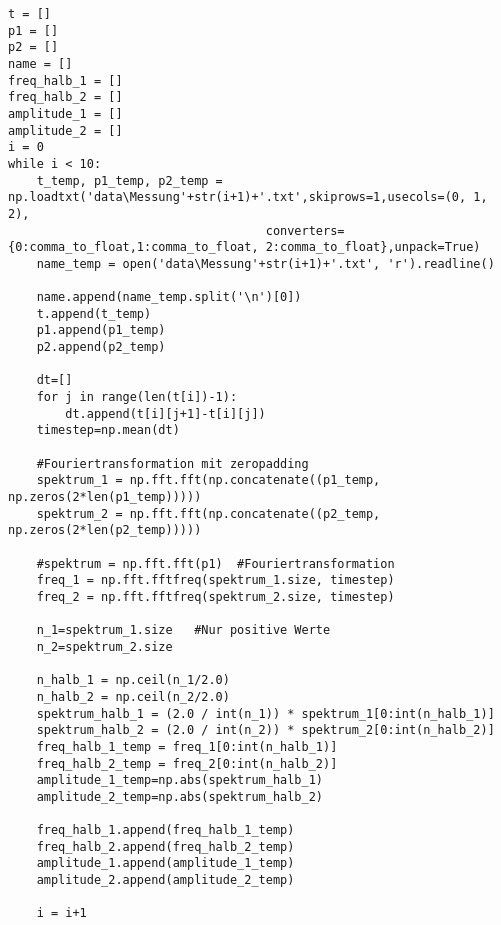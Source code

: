 \documentclass[a4paper,10pt]{article}
\begin{document}
\begin{lstlisting}
t = []
p1 = []
p2 = []
name = []
freq_halb_1 = []
freq_halb_2 = []
amplitude_1 = []
amplitude_2 = []
i = 0
while i < 10:
    t_temp, p1_temp, p2_temp = np.loadtxt('data\Messung'+str(i+1)+'.txt',skiprows=1,usecols=(0, 1, 2),
                                    converters={0:comma_to_float,1:comma_to_float, 2:comma_to_float},unpack=True)
    name_temp = open('data\Messung'+str(i+1)+'.txt', 'r').readline()
    
    name.append(name_temp.split('\n')[0])
    t.append(t_temp)
    p1.append(p1_temp)
    p2.append(p2_temp)
    
    dt=[]
    for j in range(len(t[i])-1): 
        dt.append(t[i][j+1]-t[i][j])
    timestep=np.mean(dt)
    
    #Fouriertransformation mit zeropadding
    spektrum_1 = np.fft.fft(np.concatenate((p1_temp, np.zeros(2*len(p1_temp)))))
    spektrum_2 = np.fft.fft(np.concatenate((p2_temp, np.zeros(2*len(p2_temp)))))  
    
    #spektrum = np.fft.fft(p1)  #Fouriertransformation    
    freq_1 = np.fft.fftfreq(spektrum_1.size, timestep)
    freq_2 = np.fft.fftfreq(spektrum_2.size, timestep)
    
    n_1=spektrum_1.size   #Nur positive Werte
    n_2=spektrum_2.size
    
    n_halb_1 = np.ceil(n_1/2.0)
    n_halb_2 = np.ceil(n_2/2.0)
    spektrum_halb_1 = (2.0 / int(n_1)) * spektrum_1[0:int(n_halb_1)]
    spektrum_halb_2 = (2.0 / int(n_2)) * spektrum_2[0:int(n_halb_2)]
    freq_halb_1_temp = freq_1[0:int(n_halb_1)]
    freq_halb_2_temp = freq_2[0:int(n_halb_2)]
    amplitude_1_temp=np.abs(spektrum_halb_1)
    amplitude_2_temp=np.abs(spektrum_halb_2)
    
    freq_halb_1.append(freq_halb_1_temp)
    freq_halb_2.append(freq_halb_2_temp)
    amplitude_1.append(amplitude_1_temp)
    amplitude_2.append(amplitude_2_temp)
    
    i = i+1


\end{lstlisting}
\end{document}
